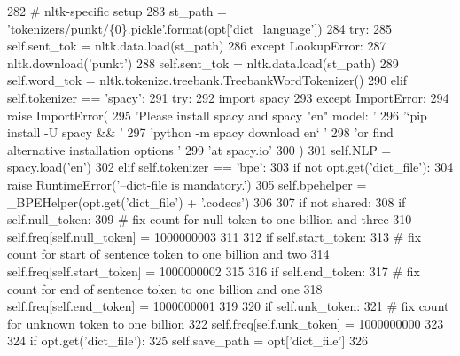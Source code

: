 \begin{DoxyCode}
282             \textcolor{comment}{# nltk-specific setup}
283             st\_path = \textcolor{stringliteral}{'tokenizers/punkt/\{0\}.pickle'}.\hyperlink{namespaceparlai_1_1chat__service_1_1services_1_1messenger_1_1shared__utils_a32e2e2022b824fbaf80c747160b52a76}{format}(opt[\textcolor{stringliteral}{'dict\_language'}])
284             \textcolor{keywordflow}{try}:
285                 self.sent\_tok = nltk.data.load(st\_path)
286             \textcolor{keywordflow}{except} LookupError:
287                 nltk.download(\textcolor{stringliteral}{'punkt'})
288                 self.sent\_tok = nltk.data.load(st\_path)
289             self.word\_tok = nltk.tokenize.treebank.TreebankWordTokenizer()
290         \textcolor{keywordflow}{elif} self.tokenizer == \textcolor{stringliteral}{'spacy'}:
291             \textcolor{keywordflow}{try}:
292                 \textcolor{keyword}{import} spacy
293             \textcolor{keywordflow}{except} ImportError:
294                 \textcolor{keywordflow}{raise} ImportError(
295                     \textcolor{stringliteral}{'Please install spacy and spacy "en" model: '}
296                     \textcolor{stringliteral}{'`pip install -U spacy && '}
297                     \textcolor{stringliteral}{'python -m spacy download en` '}
298                     \textcolor{stringliteral}{'or find alternative installation options '}
299                     \textcolor{stringliteral}{'at spacy.io'}
300                 )
301             self.NLP = spacy.load(\textcolor{stringliteral}{'en'})
302         \textcolor{keywordflow}{elif} self.tokenizer == \textcolor{stringliteral}{'bpe'}:
303             \textcolor{keywordflow}{if} \textcolor{keywordflow}{not} opt.get(\textcolor{stringliteral}{'dict\_file'}):
304                 \textcolor{keywordflow}{raise} RuntimeError(\textcolor{stringliteral}{'--dict-file is mandatory.'})
305             self.bpehelper = \_BPEHelper(opt.get(\textcolor{stringliteral}{'dict\_file'}) + \textcolor{stringliteral}{'.codecs'})
306 
307         \textcolor{keywordflow}{if} \textcolor{keywordflow}{not} shared:
308             \textcolor{keywordflow}{if} self.null\_token:
309                 \textcolor{comment}{# fix count for null token to one billion and three}
310                 self.freq[self.null\_token] = 1000000003
311 
312             \textcolor{keywordflow}{if} self.start\_token:
313                 \textcolor{comment}{# fix count for start of sentence token to one billion and two}
314                 self.freq[self.start\_token] = 1000000002
315 
316             \textcolor{keywordflow}{if} self.end\_token:
317                 \textcolor{comment}{# fix count for end of sentence token to one billion and one}
318                 self.freq[self.end\_token] = 1000000001
319 
320             \textcolor{keywordflow}{if} self.unk\_token:
321                 \textcolor{comment}{# fix count for unknown token to one billion}
322                 self.freq[self.unk\_token] = 1000000000
323 
324             \textcolor{keywordflow}{if} opt.get(\textcolor{stringliteral}{'dict\_file'}):
325                 self.save\_path = opt[\textcolor{stringliteral}{'dict\_file'}]
326 
\end{DoxyCode}


